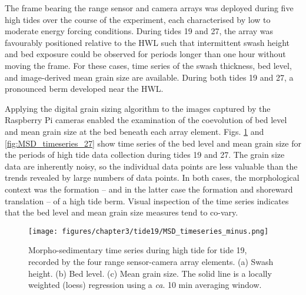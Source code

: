 The frame bearing the range sensor and camera arrays was deployed during five high tides over the course of the experiment, each characterised by low to moderate energy forcing conditions. During tides 19 and 27, the array was favourably positioned relative to the HWL such that intermittent swash height and bed exposure could be observed for periods longer than one hour without moving the frame. For these cases, time series of the swash thickness, bed level, and image-derived mean grain size are available. During both tides 19 and 27, a pronounced berm developed near the HWL.

Applying the digital grain sizing algorithm to the images captured by the Raspberry Pi cameras enabled the examination of the coevolution of bed level and mean grain size at the bed beneath each array element. Figs. \ref{fig:MSD_timeseries_19} and \ref{fig:MSD_timeseries_27} show time series of the bed level and mean grain size for the periods of high tide data collection during tides 19 and 27. The grain size data are inherently noisy, so the individual data points are less valuable than the trends revealed by large numbers of data points. In both cases, the morphological context was the formation -- and in the latter case the formation and shoreward translation -- of a high tide berm. Visual inspection of the time series indicates that the bed level and mean grain size measures tend to co-vary. 

\begin{figure}[tbp] %
  	\texttt{[image: figures/chapter3/tide19/MSD\_timeseries\_minus.png]}
  	\caption[Time series of swash zone bed level and mean grain size, tide 19]{Morpho-sedimentary time series during high tide for tide 19, recorded by the four range sensor-camera array elements. (a) Swash height. (b) Bed level. (c) Mean grain size. The solid line is a locally weighted (loess) regression using a \textit{ca}. 10 min averaging window.}
 	\label{fig:MSD_timeseries_19}
\end{figure}

